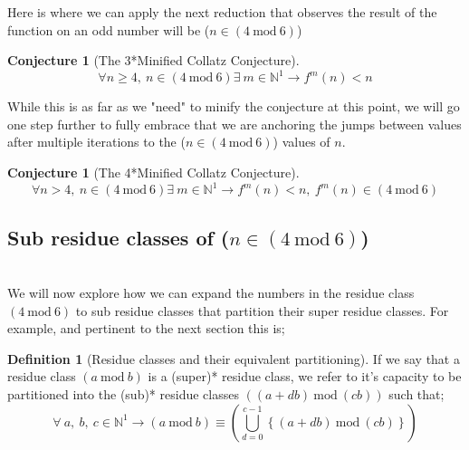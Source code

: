 \documentclass[12pt,a4paper]{amsart}
\numberwithin{equation}{section}
\theoremstyle{plain}
\theoremstyle{definition}
\newtheorem{Def}[Th]{Definition}
\newtheorem{Conj}[Th]{Conjecture}
\begin{document}
Here is where we can apply the next reduction that observes the result of the function on an odd number will be ($n \in \left ( 4\:\mathrm{mod}\:6 \right )$)

\begin{Conj}[The 3*Minified Collatz Conjecture]
\begin{equation}
\forall n\geq4\mathrm{,}\:n \in \left ( 4\:\mathrm{mod}\:6 \right ) \exists \: m \in \mathbb{N}^{1} \rightarrow f^{m}\left ( n \right )<n
\end{equation}
\end{Conj}

While this is as far as we "need" to minify the conjecture at this point, we will go one step further to fully embrace that we are anchoring the jumps between values after multiple iterations to the ($n \in \left ( 4\:\mathrm{mod}\:6 \right )$) values of $n$.

\begin{Conj}[The 4*Minified Collatz Conjecture]
\begin{equation}
\forall n>4\mathrm{,}\:n \in \left ( 4\:\mathrm{mod}\:6 \right ) \exists \: m \in \mathbb{N}^{1} \rightarrow f^{m}\left ( n \right )<n\mathrm{,}\:f^{m}\left ( n \right ) \in \left ( 4\:\mathrm{mod}\:6 \right )
\end{equation}
\end{Conj}

\subsection{Sub residue classes of ($n \in \left ( 4\:\mathrm{mod}\:6 \right )$)} \hfill\\

We will now explore how we can expand the numbers in the residue class $\left ( 4\:\mathrm{mod}\:6 \right )$ to sub residue classes that partition their super residue classes. For example, and pertinent to the next section this is;

\begin{Def}[Residue classes and their equivalent partitioning]
If we say that a residue class $\left ( a\:\mathrm{mod}\:b \right )$ is a (super)* residue class, we refer to it's capacity to be partitioned into the (sub)* residue classes $\left ( \left (a+db  \right )\:\mathrm{mod}\:\left (cb  \right ) \right )$ such that;
\begin{equation}
\forall \:a\mathrm{,}\:b\mathrm{,}\:c \in \mathbb{N}^{1} \rightarrow \left ( a\:\mathrm{mod}\:b \right ) \equiv \left (\bigcup_{d=0}^{c-1} \left \{ \left (a+db  \right )\:\mathrm{mod}\:\left (cb  \right ) \right \}  \right )
\end{equation}
\end{Def}
\end{document}
